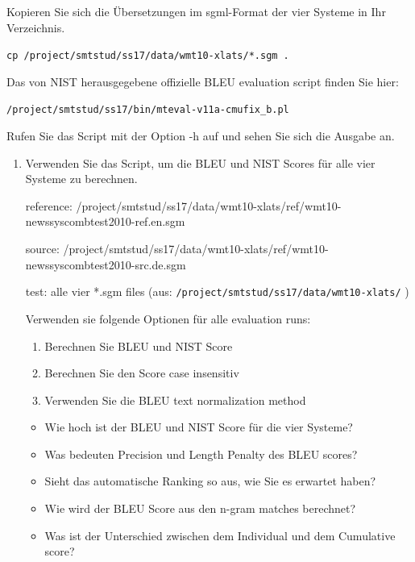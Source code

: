\documentclass[12pt,fleqn]{article}
\begin{document}
\begin{enumerate}
\vspace{0.5cm} 
Kopieren Sie sich die Übersetzungen im sgml-Format der vier Systeme in Ihr Verzeichnis.

\texttt{cp /project/smtstud/ss17/data/wmt10-xlats/*.sgm .} 

\vspace{0.5cm} 
Das von NIST herausgegebene offizielle BLEU evaluation script finden Sie hier:

\texttt{/project/smtstud/ss17/bin/mteval-v11a-cmufix\_b.pl} 

\vspace{0.5cm} 
Rufen Sie das Script mit der Option -h auf und sehen Sie sich die Ausgabe an.

\vspace{0.5cm} 
\begin{enumerate} 
\item Verwenden Sie das Script, um die BLEU und NIST Scores für alle vier Systeme zu berechnen.

\vspace{0.5cm} 
reference: /project/smtstud/ss17/data/wmt10-xlats/ref/wmt10-newssyscombtest2010-ref.en.sgm

source:     
/project/smtstud/ss17/data/wmt10-xlats/ref/wmt10-newssyscombtest2010-src.de.sgm

test:            alle vier *.sgm files (aus: \texttt{/project/smtstud/ss17/data/wmt10-xlats/} )

\vspace{0.5cm} 
Verwenden sie folgende Optionen für alle evaluation runs:

\vspace{0.5cm} 
\begin{enumerate} 
\item Berechnen Sie BLEU und NIST Score
\item Berechnen Sie den Score case insensitiv
\item Verwenden Sie die BLEU text normalization method
\end{enumerate} 

\vspace{0.5cm} 
\begin{itemize} 
\item Wie hoch ist der BLEU und NIST Score für die vier Systeme?
\item Was bedeuten Precision und Length Penalty des BLEU scores?
\item Sieht das automatische Ranking so aus, wie Sie es erwartet haben?
\item Wie wird der BLEU Score aus den n-gram matches berechnet?
\item Was ist der Unterschied zwischen dem Individual und dem Cumulative score?
\end{itemize} 


\end{enumerate}
\end{enumerate}
\end{document}
